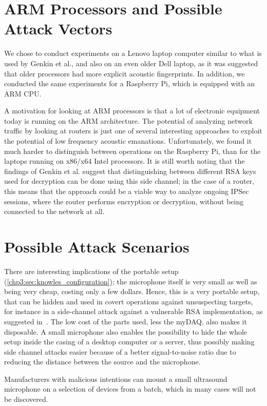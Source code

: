 \section{ARM Processors and Possible Attack Vectors}
We chose to conduct experiments on a Lenovo laptop computer similar to what is used by Genkin et al., and also on an even older Dell laptop, as it was suggested that older processors had more explicit acoustic fingerprints.
In addition, we conducted the same experiments for a Raspberry Pi, which is equipped with an ARM \gls{CPU}.

A motivation for looking at ARM processors is that a lot of electronic equipment today is running on the ARM architecture.
The potential of analyzing network traffic by looking at routers is just one of several interesting approaches to exploit the potential of low frequency acoustic emanations.
Unfortunately, we found it much harder to distinguish between operations on the Raspberry Pi, than for the laptops running on x86/x64 Intel processors.
It is still worth noting that the findings of Genkin et al. suggest that distinguishing between different RSA keys used for decryption can be done using this side channel; in the case of a router, this means that the approach could be a viable way to analyze ongoing IPSec sessions, where the router performs encryption or decryption, without being connected to the network at all.


\section{Possible Attack Scenarios}\label{chp6:sec:attack_scenarios}

There are interesting implications of the portable setup (\autoref{chp3:sec:knowles_configuration}); the microphone itself is very small as well as being very cheap, costing only a few dollars. 
Hence, this is a very portable setup, that can be hidden and used in covert operations against unsuspecting targets, for instance in a side-channel attack against a vulnerable RSA implementation, as suggested in~\cite{DBLP:conf/crypto/GenkinST14}.
The low cost of the parts used, less the myDAQ, also makes it disposable.
A small microphone also enables the possibility to hide the whole setup inside the casing of a desktop computer or a server, thus possibly making side channel attacks easier because of a better signal-to-noise ratio due to reducing the distance between the source and the microphone.

Manufacturers with malicious intentions can mount a small ultrasound microphone on a selection of devices from a batch, which in many cases will not be discovered.

